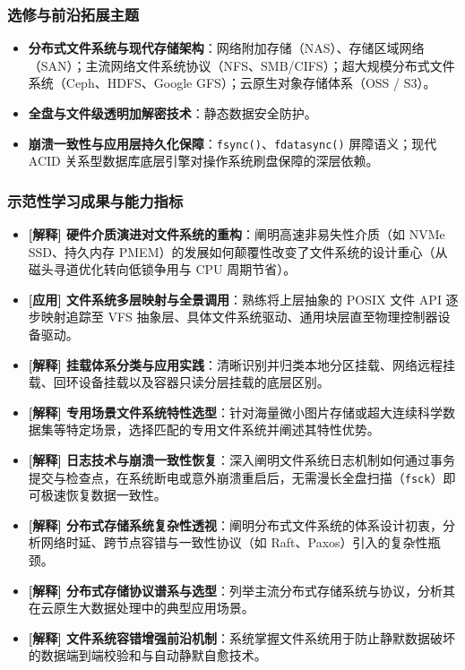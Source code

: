 \subsubsection{选修与前沿拓展主题}
\begin{itemize}\setlength{\itemsep}{0pt}\setlength{\parskip}{0pt}
    \item \textbf{分布式文件系统与现代存储架构}：网络附加存储（NAS）、存储区域网络（SAN）；主流网络文件系统协议（NFS、SMB/CIFS）；超大规模分布式文件系统（Ceph、HDFS、Google GFS）；云原生对象存储体系（OSS / S3）。
    \item \textbf{全盘与文件级透明加解密技术}：静态数据安全防护。
    \item \textbf{崩溃一致性与应用层持久化保障}：\texttt{fsync()}、\texttt{fdatasync()} 屏障语义；现代 ACID 关系型数据库底层引擎对操作系统刷盘保障的深层依赖。
\end{itemize}

\subsubsection{示范性学习成果与能力指标}
\begin{itemize}\setlength{\itemsep}{0pt}\setlength{\parskip}{0pt}
    \item \textbf{[解释] 硬件介质演进对文件系统的重构}：阐明高速非易失性介质（如 NVMe SSD、持久内存 PMEM）的发展如何颠覆性改变了文件系统的设计重心（从磁头寻道优化转向低锁争用与 CPU 周期节省）。
    \item \textbf{[应用] 文件系统多层映射与全景调用}：熟练将上层抽象的 POSIX 文件 API 逐步映射追踪至 VFS 抽象层、具体文件系统驱动、通用块层直至物理控制器设备驱动。
    \item \textbf{[解释] 挂载体系分类与应用实践}：清晰识别并归类本地分区挂载、网络远程挂载、回环设备挂载以及容器只读分层挂载的底层区别。
    \item \textbf{[解释] 专用场景文件系统特性选型}：针对海量微小图片存储或超大连续科学数据集等特定场景，选择匹配的专用文件系统并阐述其特性优势。
    \item \textbf{[解释] 日志技术与崩溃一致性恢复}：深入阐明文件系统日志机制如何通过事务提交与检查点，在系统断电或意外崩溃重启后，无需漫长全盘扫描（\texttt{fsck}）即可极速恢复数据一致性。
    \item \textbf{[解释] 分布式存储系统复杂性透视}：阐明分布式文件系统的体系设计初衷，分析网络时延、跨节点容错与一致性协议（如 Raft、Paxos）引入的复杂性瓶颈。
    \item \textbf{[解释] 分布式存储协议谱系与选型}：列举主流分布式存储系统与协议，分析其在云原生大数据处理中的典型应用场景。
    \item \textbf{[解释] 文件系统容错增强前沿机制}：系统掌握文件系统用于防止静默数据破坏的数据端到端校验和与自动静默自愈技术。
\end{itemize}

